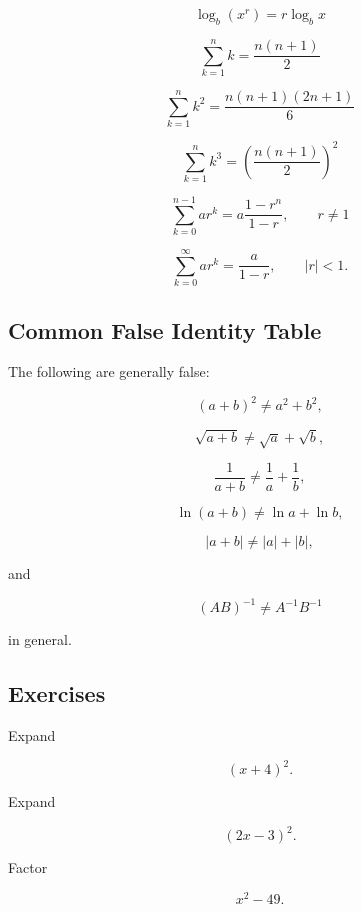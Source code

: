 \[
\boxed{
\log_b(x^r)
=
r\log_bx
}
\]

\[
\boxed{
\sum_{k=1}^{n}k
=
\frac{n(n+1)}{2}
}
\]

\[
\boxed{
\sum_{k=1}^{n}k^2
=
\frac{n(n+1)(2n+1)}{6}
}
\]

\[
\boxed{
\sum_{k=1}^{n}k^3
=
\left(
\frac{n(n+1)}{2}
\right)^2
}
\]

\[
\boxed{
\sum_{k=0}^{n-1}ar^k
=
a\frac{1-r^n}{1-r},
\qquad
r\neq1
}
\]

\[
\boxed{
\sum_{k=0}^{\infty}ar^k
=
\frac{a}{1-r},
\qquad
|r|<1.
}
\]

\subsection{Common False Identity Table}
\label{subsec:common-false-identity-table}

The following are generally false:

\[
\boxed{
(a+b)^2
\neq
a^2+b^2,
}
\]

\[
\boxed{
\sqrt{a+b}
\neq
\sqrt a+\sqrt b,
}
\]

\[
\boxed{
\frac1{a+b}
\neq
\frac1a+\frac1b,
}
\]

\[
\boxed{
\ln(a+b)
\neq
\ln a+\ln b,
}
\]

\[
\boxed{
|a+b|
\neq
|a|+|b|,
}
\]

and

\[
\boxed{
(AB)^{-1}
\neq
A^{-1}B^{-1}
}
\]

in general.

\subsection{Exercises}
\label{subsec:algebraic-identities-exercises}

\begin{exercise}[1]
Expand

\[
(x+4)^2.
\]
\end{exercise}

\begin{exercise}[1]
Expand

\[
(2x-3)^2.
\]
\end{exercise}

\begin{exercise}[1]
Factor

\[
x^2-49.
\]
\end{exercise}

